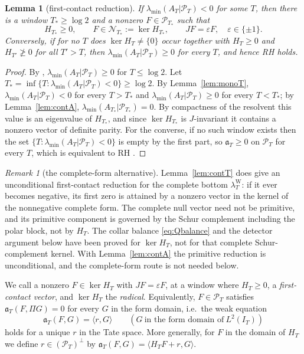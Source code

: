 \documentclass[11pt]{amsart}
\newtheorem{lemma}[theorem]{Lemma}
\theoremstyle{definition}
\theoremstyle{remark}
\newtheorem{remark}[theorem]{Remark}
\newcommand{\PT}{\mathcal P_T}
\newcommand{\IT}{I_T}
\newcommand{\lamW}{\lambda^{\mathrm W}_T}
\newcommand{\lamA}{\lambda_{\min}(A_T|\PT)}
\begin{document}
\begin{lemma}[first-contact reduction]\label{lem:firstcontact}
If $\lamA<0$ for some $T$, then there
is a window $T_*\ge\log2$ and a nonzero $F\in\mathcal P_{T_*}$ such that
\[
 H_{T_*}\ge0,\qquad F\in\mathcal N_{T_*}:=\ker H_{T_*},\qquad JF=\varepsilon F,\quad \varepsilon\in\{\pm1\}.
\]
Conversely, if for no $T$ does $\ker H_T\ne\{0\}$ occur together with $H_T\ge0$ and $H_{T'}\not\ge0$
for all $T'>T$, then $\lamA\ge0$ for every $T$, and hence RH holds.
\end{lemma}

\begin{proof}
By \cite{Paper42}, $\lamA\ge0$ for $T\le\log2$. Let $T_*=\inf\{T:\lamA<0\}\ge\log2$. By
Lemma~\ref{lem:monoT}, $\lamA<0$ for every $T>T_*$ and $\lamA\ge0$ for every $T<T_*$; by
Lemma~\ref{lem:contA}, $\lambda_{\min}(A_{T_*}|\mathcal P_{T_*})=0$. By compactness of the resolvent this
value is an eigenvalue of $H_{T_*}$, and since $\ker H_{T_*}$ is $J$-invariant it contains a nonzero
vector of definite parity. For the converse, if no such window exists then the set
$\{T:\lamA<0\}$ is empty by the first part, so $\mathfrak a_T\ge0$ on $\PT$ for every $T$, which is
equivalent to RH \cite[Thm.~11.3]{Paper45}.
\end{proof}

\begin{remark}[the complete-form alternative]\label{rem:completecontact}
Lemma~\ref{lem:contT} does give an unconditional first-contact reduction for the complete bottom
$\lamW$: if it ever becomes negative, its first zero is attained by a nonzero vector in the kernel
of the nonnegative complete form.  The complete null vector need not be primitive, and its primitive component is governed by the
Schur complement including the polar block, not by $H_T$.  The collar balance
\eqref{eq:Qbalance} and the detector argument below have been proved for $\ker H_T$, not for that
complete Schur-complement kernel.  With Lemma~\ref{lem:contA} the primitive reduction is unconditional, and the complete-form
route is not needed below.
\end{remark}

We call a nonzero $F\in\ker H_T$ with $JF=\varepsilon F$, at a window where $H_T\ge0$, a
\emph{first-contact vector}, and $\ker H_T$ the \emph{radical}. Equivalently, $F\in\PT$ satisfies
$\mathfrak a_T(F,\Pi G)=0$ for every $G$ in the form domain, i.e.\ the weak equation
\begin{equation}\label{eq:localweak}
 \mathfrak a_T(F,G)=\langle r,G\rangle\qquad(G\ \text{in the form domain of}\ L^2(\IT))
\end{equation}
holds for a unique $r$ in the Tate space. More generally, for $F$ in the domain of $H_T$ we define
$r\in(\PT)^\perp$ by $\mathfrak a_T(F,G)=\langle H_TF+r,G\rangle$.
\end{document}
